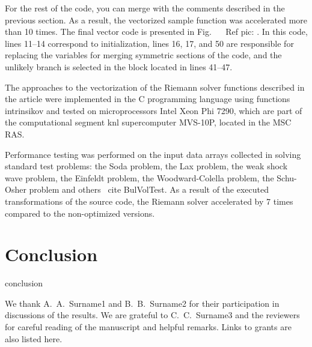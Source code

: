 \documentclass[
11pt,%
tightenlines,%
twoside,%
onecolumn,%
nofloats,%
nobibnotes,%
nofootinbib,%
superscriptaddress,%
noshowpacs,%
centertags]%
{revtex4}
\begin{document}
For the rest of the code, you can merge with the comments described in the previous section. As a result, the vectorized sample function was accelerated more than 10 times. The final vector code is presented in Fig. ~ \ Ref {pic: }. In this code, lines 11–14 correspond to initialization, lines 16, 17, and 50 are responsible for replacing the variables for merging symmetric sections of the code, and the unlikely branch is selected in the block located in lines 41–47.

The approaches to the vectorization of the Riemann solver functions described in the article were implemented in the C programming language using functions intrinsikov and tested on microprocessors Intel Xeon Phi 7290, which are part of the computational segment knl supercomputer MVS-10P, located in the MSC RAS.

Performance testing was performed on the input data arrays collected in solving standard test problems: the Soda problem, the Lax problem, the weak shock wave problem, the Einfeldt problem, the Woodward-Colella problem, the Schu-Osher problem and others \ cite {BulVolTest}. As a result of the executed transformations of the source code, the Riemann solver accelerated by 7 times compared to the non-optimized versions.

\section{Conclusion}

conclusion

\begin{acknowledgments}
We thank A.~A.~Surname1 and B.~B.~Surname2 for their participation in discussions of the results. We are grateful to C.~C.~Surname3 and the reviewers for careful reading of the manuscript and helpful remarks. Links to grants are also listed here.
\end{acknowledgments}
\end{document}
